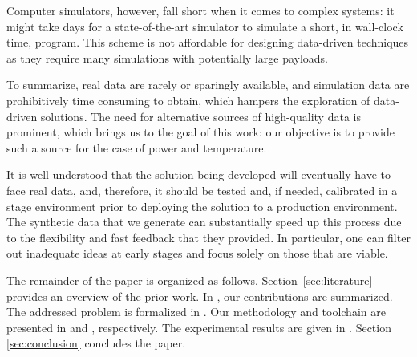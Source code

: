 Computer simulators, however, fall short when it comes to complex systems: it
might take days for a state-of-the-art simulator to simulate a short, in
wall-clock time, program. This scheme is not affordable for designing
data-driven techniques as they require many simulations with potentially large
payloads.

To summarize, real data are rarely or sparingly available, and simulation data
are prohibitively time consuming to obtain, which hampers the exploration of
data-driven solutions. The need for alternative sources of high-quality data is
prominent, which brings us to the goal of this work: our objective is to provide
such a source for the case of power and temperature.

It is well understood that the solution being developed will eventually have to
face real data, and, therefore, it should be tested and, if needed, calibrated
in a stage environment prior to deploying the solution to a production
environment. The synthetic data that we generate can substantially speed up this
process due to the flexibility and fast feedback that they provided. In
particular, one can filter out inadequate ideas at early stages and focus solely
on those that are viable.

The remainder of the paper is organized as follows. Section~\ref{sec:literature}
provides an overview of the prior work. In , our
contributions are summarized. The addressed problem is formalized in
. Our methodology and toolchain are presented in
 and , respectively. The experimental results
are given in . Section \ref{sec:conclusion} concludes the paper.
